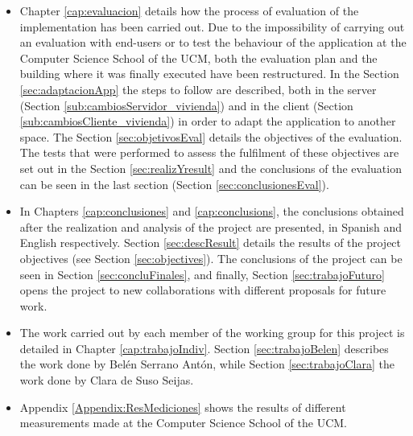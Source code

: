 \begin{itemize}
	\item Chapter \ref{cap:evaluacion} details how the process of evaluation of the implementation has been carried out. Due to the impossibility of carrying out an evaluation with end-users or to test the behaviour of the application at the Computer Science School of the UCM, both the evaluation plan and the building where it was finally executed have been restructured. In the Section \ref{sec:adaptacionApp} the steps to follow are described, both in the server (Section \ref{sub:cambiosServidor_vivienda}) and in the client (Section \ref{sub:cambiosCliente_vivienda}) in order to adapt the application to another space. The Section \ref{sec:objetivosEval} details the objectives of the evaluation. The tests that were performed to assess the fulfilment of these objectives are set out in the Section \ref{sec:realizYresult} and the conclusions of the evaluation can be seen in the last section (Section \ref{sec:conclusionesEval}).
	
	\item In Chapters \ref{cap:conclusiones} and \ref{cap:conclusions}, the conclusions obtained after the realization and analysis of the project are presented, in Spanish and English respectively. Section \ref{sec:descResult} details the results of the project objectives (see Section \ref{sec:objectives}). The conclusions of the project can be seen in Section \ref{sec:concluFinales}, and finally, Section \ref{sec:trabajoFuturo} opens the project to new collaborations with different proposals for future work.
	
	\item The work carried out by each member of the working group for this project is detailed in Chapter \ref{cap:trabajoIndiv}. Section \ref{sec:trabajoBelen} describes the work done by Belén Serrano Antón, while Section \ref{sec:trabajoClara} the work done by Clara de Suso Seijas.
	
	\item Appendix \ref{Appendix:ResMediciones} shows the results of different measurements made at the Computer Science School of the UCM.
	
\end{itemize}










